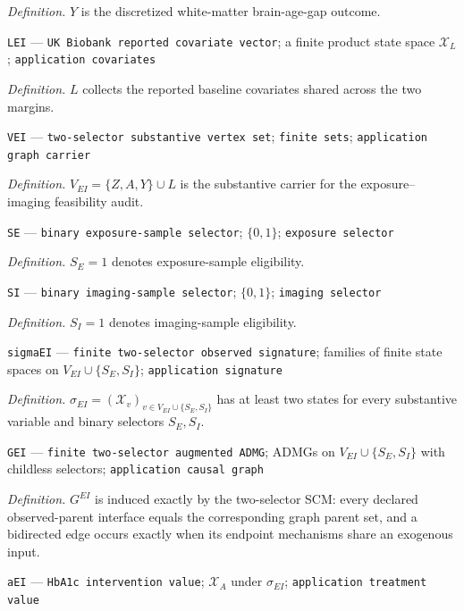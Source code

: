 \documentclass{article}
\begin{document}
\begin{itemize}
{{{{  \par\smallskip\noindent\emph{Definition.} \(Y\) is the discretized white-matter brain-age-gap outcome.
  \item \texttt{LEI} --- \texttt{UK Biobank reported covariate vector}; a finite product state space \(\mathcal X_L\); \texttt{application covariates}
  \par\smallskip\noindent\emph{Definition.} \(L\) collects the reported baseline covariates shared across the two margins.
  \item \texttt{VEI} --- \texttt{two-\allowbreak{}selector substantive vertex set}; \texttt{finite sets}; \texttt{application graph carrier}
  \par\smallskip\noindent\emph{Definition.} \(V_{EI}=\{Z,A,Y\}\cup L\) is the substantive carrier for the exposure--imaging feasibility audit.
  \item \texttt{SE} --- \texttt{binary exposure-\allowbreak{}sample selector}; \(\{0,1\}\); \texttt{exposure selector}
  \par\smallskip\noindent\emph{Definition.} \(S_E=1\) denotes exposure-sample eligibility.
  \item \texttt{SI} --- \texttt{binary imaging-\allowbreak{}sample selector}; \(\{0,1\}\); \texttt{imaging selector}
  \par\smallskip\noindent\emph{Definition.} \(S_I=1\) denotes imaging-sample eligibility.
  \item \texttt{sigmaEI} --- \texttt{finite two-\allowbreak{}selector observed signature}; families of finite state spaces on \(V_{EI}\cup\{S_E,S_I\}\); \texttt{application signature}
  \par\smallskip\noindent\emph{Definition.} \(\sigma_{EI}=(\mathcal X_v)_{v\in V_{EI}\cup\{S_E,S_I\}}\) has at least two states for every substantive variable and binary selectors \(S_E,S_I\).
  \item \texttt{GEI} --- \texttt{finite two-\allowbreak{}selector augmented ADMG}; ADMGs on \(V_{EI}\cup\{S_E,S_I\}\) with childless selectors; \texttt{application causal graph}
  \par\smallskip\noindent\emph{Definition.} \(G^{EI}\) is induced exactly by the two-selector SCM: every declared observed-parent interface equals the corresponding graph parent set, and a bidirected edge occurs exactly when its endpoint mechanisms share an exogenous input.
  \item \texttt{aEI} --- \texttt{HbA1c intervention value}; \(\mathcal X_A\) under \(\sigma_{EI}\); \texttt{application treatment value}
}}}}
\end{itemize}
\end{document}
